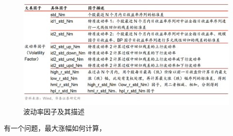\begin{figure}[hbt]
	\centering
	\includegraphics[scale=0.3]{figure/波动率因子_华泰.pic.jpg}
	\caption{波动率因子及其描述}
\end{figure}
	
有一个问题，最大涨幅如何计算，














